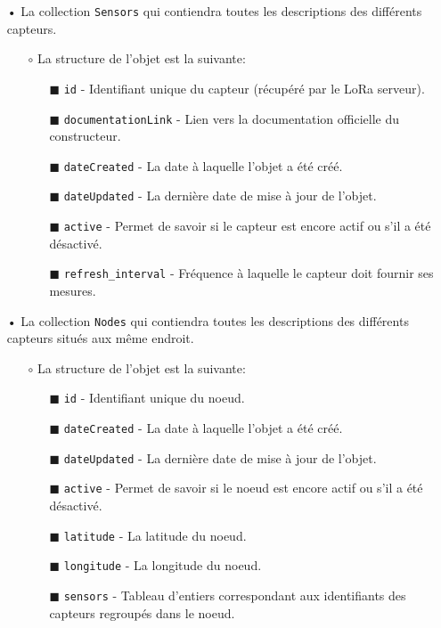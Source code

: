 \begin{itemize}
\item[•] La collection \texttt{Sensors} qui contiendra toutes les descriptions des différents capteurs. 
\begin{itemize}
\item[$\circ$] La structure de l'objet est la suivante: 
\begin{itemize}
\item[\tiny$\blacksquare$] \texttt{id} - Identifiant unique du capteur (récupéré par le LoRa serveur).
\item[\tiny$\blacksquare$] \texttt{documentationLink} - Lien vers la documentation officielle du constructeur.
\item[\tiny$\blacksquare$] \texttt{dateCreated} - La date à laquelle l'objet a été créé.
\item[\tiny$\blacksquare$] \texttt{dateUpdated} - La dernière date de mise à jour de l'objet.
\item[\tiny$\blacksquare$] \texttt{active} - Permet de savoir si le capteur est encore actif ou s'il a été désactivé.
\item[\tiny$\blacksquare$] \texttt{refresh\_interval} - Fréquence à laquelle le capteur doit fournir ses mesures.
\end{itemize}
\end{itemize}
\vspace{5mm}

\item[•] La collection \texttt{Nodes} qui contiendra toutes les descriptions des différents capteurs situés aux même endroit. 
\begin{itemize}
\item[$\circ$] La structure de l'objet est la suivante: 
\begin{itemize}
\item[\tiny$\blacksquare$] \texttt{id} - Identifiant unique du noeud.
\item[\tiny$\blacksquare$] \texttt{dateCreated} - La date à laquelle l'objet a été créé.
\item[\tiny$\blacksquare$] \texttt{dateUpdated} - La dernière date de mise à jour de l'objet.
\item[\tiny$\blacksquare$] \texttt{active} - Permet de savoir si le noeud est encore actif ou s'il a été désactivé.
\item[\tiny$\blacksquare$] \texttt{latitude} - La latitude du noeud.
\item[\tiny$\blacksquare$] \texttt{longitude} - La longitude du noeud.
\item[\tiny$\blacksquare$] \texttt{sensors} - Tableau d'entiers correspondant aux identifiants des capteurs regroupés dans le noeud.
\end{itemize}
\end{itemize}
\end{itemize}

